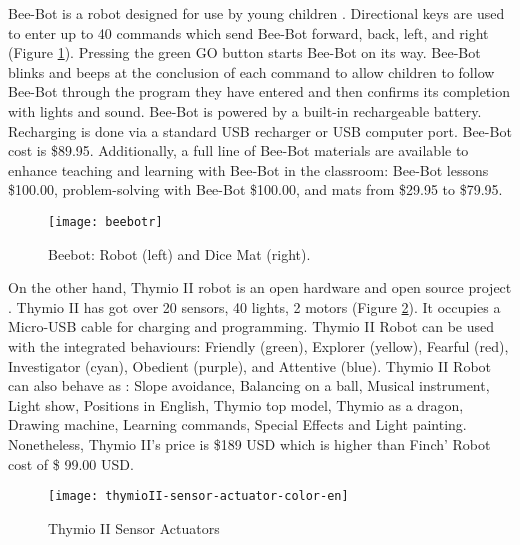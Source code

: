 Bee-Bot  is a robot designed for use by young children \cite{bee-bot2014}. 
Directional keys are used to enter up to 40 commands which send Bee-Bot forward, back, 
left, and right (Figure \ref{fig:beebot}). Pressing the green GO button starts Bee-Bot 
on its way. Bee-Bot blinks and beeps at the conclusion of each command to allow children 
to follow Bee-Bot through the program they have entered and then confirms its completion 
with lights and sound. Bee-Bot is powered by a built-in rechargeable battery. Recharging 
is done via a standard USB recharger or USB computer port. Bee-Bot cost is \$89.95.
Additionally, a full line of Bee-Bot materials are available to enhance teaching and 
learning with Bee-Bot in the classroom: Bee-Bot lessons \$100.00, problem-solving with 
Bee-Bot \$100.00, and mats from \$29.95 to \$79.95. 
\begin{figure}[htbp!] 
\centering    
\texttt{[image: beebotr]}
\caption[PA]{Beebot: Robot (left) and Dice Mat (right).}
\label{fig:beebot}
\end{figure}
 
On the other hand, Thymio II robot is an open hardware and open source project 
\cite{timio}. Thymio II has got over 20 sensors, 40 lights, 2 motors 
(Figure \ref{fig:th}). It occupies a Micro-USB cable for charging and programming.
Thymio II Robot can be used with the integrated behaviours: Friendly (green), Explorer 
(yellow), Fearful (red), Investigator (cyan), Obedient (purple), and Attentive (blue).	
Thymio II Robot can also behave as : Slope avoidance, Balancing on a ball, Musical 
instrument, Light show, Positions in English, Thymio top model, Thymio as a dragon, 
Drawing machine, Learning commands, Special Effects and Light painting. Nonetheless, 
Thymio II's price is \$189 USD which is higher than Finch' Robot cost of \$ 99.00 USD.
\begin{figure}[htbp!] 
\centering    
\texttt{[image: thymioII-sensor-actuator-color-en]}
\caption[PA]{Thymio II Sensor Actuators}
\label{fig:th}
\end{figure}
   

